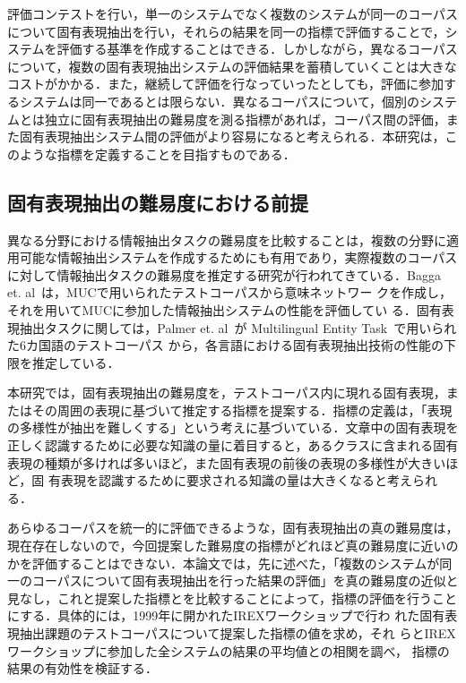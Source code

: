 評価コンテストを行い，単一のシステムでなく複数のシステムが同一のコーパス
について固有表現抽出を行い，それらの結果を同一の指標で評価することで，シ
ステムを評価する基準を作成することはできる．しかしながら，異なるコーパス
について，複数の固有表現抽出システムの評価結果を蓄積していくことは大きな
コストがかかる．また，継続して評価を行なっていったとしても，評価に参加す
るシステムは同一であるとは限らない．異なるコーパスについて，個別のシステ
ムとは独立に固有表現抽出の難易度を測る指標があれば，コーパス間の評価，ま
た固有表現抽出システム間の評価がより容易になると考えられる．本研究は，こ
のような指標を定義することを目指すものである．

\subsection{固有表現抽出の難易度における前提}

異なる分野における情報抽出タスクの難易度を比較することは，複数の分野に適
用可能な情報抽出システムを作成するためにも有用であり，実際複数のコーパス
に対して情報抽出タスクの難易度を推定する研究が行われてきている．Bagga
et. al~\cite{bagga:97}は，MUCで用いられたテストコーパスから意味ネットワー
クを作成し，それを用いてMUCに参加した情報抽出システムの性能を評価してい
る．固有表現抽出タスクに関しては，Palmer et. al~\cite{palmer:anlp97}が
Multilingual Entity Task~\cite{MUC7}で用いられた6カ国語のテストコーパス
から，各言語における固有表現抽出技術の性能の下限を推定している．

本研究では，固有表現抽出の難易度を，テストコーパス内に現れる固有表現，ま
たはその周囲の表現に基づいて推定する指標を提案する．指標の定義は，「表現
の多様性が抽出を難しくする」という考えに基づいている．文章中の固有表現を
正しく認識するために必要な知識の量に着目すると，あるクラスに含まれる固有
表現の種類が多ければ多いほど，また固有表現の前後の表現の多様性が大きいほど，固
有表現を認識するために要求される知識の量は大きくなると考えられる．

あらゆるコーパスを統一的に評価できるような，固有表現抽出の真の難易度は，
現在存在しないので，今回提案した難易度の指標がどれほど真の難易度に近いの
かを評価することはできない．本論文では，先に述べた，「複数のシステムが同
一のコーパスについて固有表現抽出を行った結果の評価」を真の難易度の近似と
見なし，これと提案した指標とを比較することによって，指標の評価を行うこと
にする．具体的には，1999年に開かれたIREXワークショップ\cite{IREXproc}で行わ
れた固有表現抽出課題のテストコーパスについて提案した指標の値を求め，それ
らとIREXワークショップに参加した全システムの結果の平均値との相関を調べ，
指標の結果の有効性を検証する．

